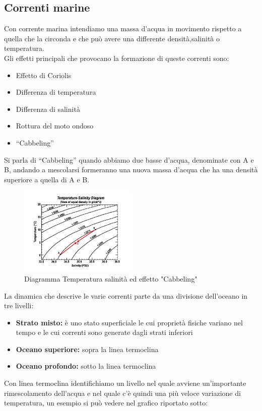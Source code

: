 \subsection{Correnti marine}
Con corrente marina intendiamo una massa d'acqua in movimento rispetto a quella che la circonda e che può avere una differente densità,salinità o temperatura.\\
Gli effetti principali che provocano la formazione di queste correnti sono:\cite{NOAA-current}
\begin{itemize}
    \item Effetto di Coriolis
    \item Differenza di temperatura
    \item Differenza di salinità
    \item Rottura del moto ondoso
    \item \enquote{Cabbeling}
\end{itemize}\noindent
Si parla di \enquote{Cabbeling} quando abbiamo due basse d'acqua, denominate con A e B, andando a mescolarsi formeranno una nuova massa d'acqua che ha una densità superiore a quella di A e B.
\vfill
\newpage
\begin{figure}[H]
    \centering
    \includegraphics[width=0.5\textwidth]{res/cap 2/temperature-salinity}
    \caption{Diagramma Temperatura salinità ed effetto "Cabbeling"}
\end{figure}\noindent
La dinamica che descrive le varie correnti parte da una divisione dell'oceano in tre livelli:
\begin{itemize}
    \item \textbf{Strato misto:} è uno stato superficiale le cui proprietà fisiche variano nel tempo e le cui correnti sono generate dagli strati inferiori
    \item \textbf{Oceano superiore:} sopra la linea termoclina
    \item \textbf{Oceano profondo:}  sotto la linea termoclina
\end{itemize}\noindent
Con linea termoclina identifichiamo un livello nel quale avviene un'importante rimescolamento dell'acqua e nel quale c'è quindi una più veloce variazione di temperatura, un esempio si può vedere nel grafico riportato sotto:
